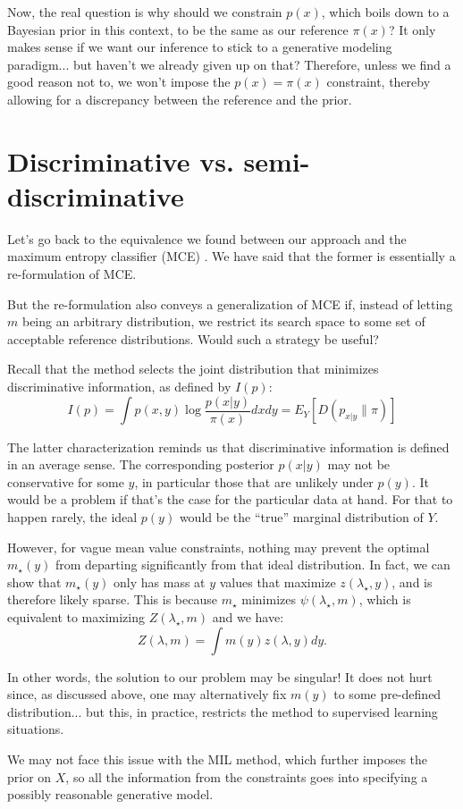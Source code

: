 \documentclass[english]{scrartcl}
\begin{document}
Now, the real question is why should we constrain $p(x)$, which boils
down to a Bayesian prior in this context, to be the same as our
reference $\pi(x)$? It only makes sense if we want our inference to
stick to a generative modeling paradigm... but haven't we already
given up on that? Therefore, unless we find a good reason not to, we
won't impose the $p(x)=\pi(x)$ constraint, thereby allowing for a
discrepancy between the reference and the prior.


\section{Discriminative vs. semi-discriminative}

Let's go back to the equivalence we found between our approach and the
maximum entropy classifier (MCE) \cite{BergerA-96}. We have said that
the former is essentially a re-formulation of MCE.

But the re-formulation also conveys a generalization of MCE if,
instead of letting $m$ being an arbitrary distribution, we restrict
its search space to some set of acceptable reference
distributions. Would such a strategy be useful? 

Recall that the method selects the joint distribution that minimizes
discriminative information, as defined by $I(p)$:
$$
I(p) 
= \int p(x,y)\log\frac{p(x|y)}{\pi(x)} dxdy
= E_Y[D(p_{x|y}\|\pi)]
$$

The latter characterization reminds us that discriminative information
is defined in an average sense. The corresponding posterior $p(x|y)$
may not be conservative for some $y$, in particular those that are
unlikely under $p(y)$. It would be a problem if that's the case for
the particular data at hand. For that to happen rarely, the ideal
$p(y)$ would be the ``true'' marginal distribution of $Y$.

However, for vague mean value constraints, nothing may prevent the
optimal $m_\star(y)$ from departing significantly from that ideal
distribution. In fact, we can show that $m_\star(y)$ only has mass at
$y$ values that maximize $z(\lambda_\star,y)$, and is therefore likely
sparse. This is because $m_\star$ minimizes $\psi(\lambda_\star,m)$,
which is equivalent to maximizing $Z(\lambda_\star,m)$ and we have:
$$
Z(\lambda, m) = \int m(y) z(\lambda, y) dy.
$$

In other words, the solution to our problem may be singular! It does
not hurt since, as discussed above, one may alternatively fix $m(y)$
to some pre-defined distribution... but this, in practice, restricts
the method to supervised learning situations.

We may not face this issue with the MIL method, which further imposes
the prior on $X$, so all the information from the constraints goes
into specifying a possibly reasonable generative model.






\end{document}
